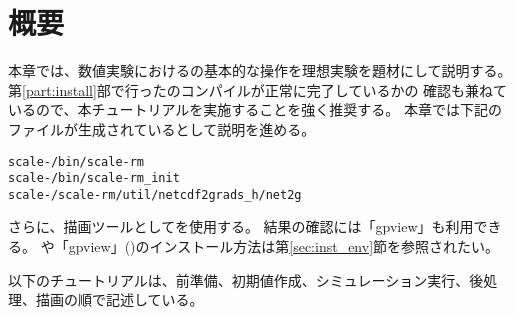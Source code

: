 \section{概要} \label{sec:ideal_exp_intro}

本章では、数値実験における{\scalerm}の基本的な操作を理想実験を題材にして説明する。
第\ref{part:install}部で行った{\scalelib}のコンパイルが正常に完了しているかの
確認も兼ねているので、本チュートリアルを実施することを強く推奨する。
本章では下記のファイルが生成されているとして説明を進める。
\begin{alltt}
  scale-{\version}/bin/scale-rm
  scale-{\version}/bin/scale-rm_init
  scale-{\version}/scale-rm/util/netcdf2grads_h/net2g
\end{alltt}
さらに、描画ツールとして\grads を使用する。
結果の確認には「gpview」も利用できる。
\grads や「gpview」(\gphys)のインストール方法は第\ref{sec:inst_env}節を参照されたい。

以下のチュートリアルは、前準備、初期値作成、シミュレーション実行、後処理、描画の順で記述している。
